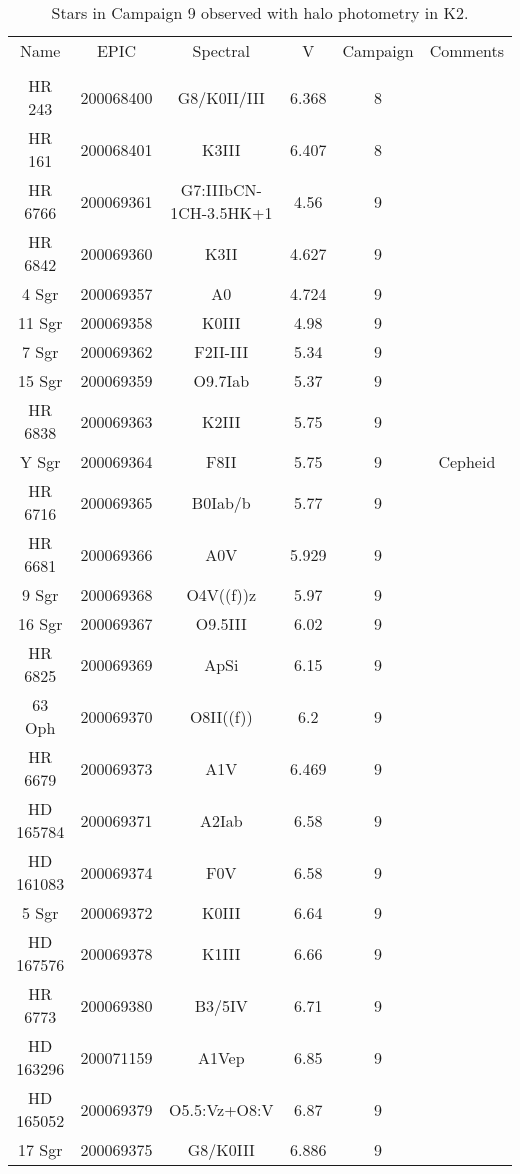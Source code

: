 \begin{table*}
\caption{Stars in Campaign 9 observed with halo photometry in K2.\label{table_1}}
\begin{tabular}{cccccc}
\hline \hline
Name & EPIC & Spectral & V & Campaign & Comments \\
 &  &  &  &  &  \\
\hline
HR 243 & 200068400 & G8/K0II/III & 6.368 & 8 &  \\
HR 161 & 200068401 & K3III & 6.407 & 8 &  \\
HR 6766 & 200069361 & G7:IIIbCN-1CH-3.5HK+1 & 4.56 & 9 &  \\
HR 6842 & 200069360 & K3II & 4.627 & 9 &  \\
4 Sgr & 200069357 & A0 & 4.724 & 9 &  \\
11 Sgr & 200069358 & K0III & 4.98 & 9 &  \\
7 Sgr & 200069362 & F2II-III & 5.34 & 9 &  \\
15 Sgr & 200069359 & O9.7Iab & 5.37 & 9 &  \\
HR 6838 & 200069363 & K2III & 5.75 & 9 &  \\
Y Sgr & 200069364 & F8II & 5.75 & 9 & Cepheid \\
HR 6716 & 200069365 & B0Iab/b & 5.77 & 9 &  \\
HR 6681 & 200069366 & A0V & 5.929 & 9 &  \\
9 Sgr & 200069368 & O4V((f))z & 5.97 & 9 &  \\
16 Sgr & 200069367 & O9.5III & 6.02 & 9 &  \\
HR 6825 & 200069369 & ApSi & 6.15 & 9 &  \\
63 Oph & 200069370 & O8II((f)) & 6.2 & 9 &  \\
HR 6679 & 200069373 & A1V & 6.469 & 9 &  \\
HD 165784 & 200069371 & A2Iab & 6.58 & 9 &  \\
HD 161083 & 200069374 & F0V & 6.58 & 9 &  \\
5 Sgr & 200069372 & K0III & 6.64 & 9 &  \\
HD 167576 & 200069378 & K1III & 6.66 & 9 &  \\
HR 6773 & 200069380 & B3/5IV & 6.71 & 9 &  \\
HD 163296 & 200071159 & A1Vep & 6.85 & 9 &  \\
HD 165052 & 200069379 & O5.5:Vz+O8:V & 6.87 & 9 &  \\
17 Sgr & 200069375 & G8/K0III & 6.886 & 9 &  \\
\hline
\end{tabular}
\end{table*}
